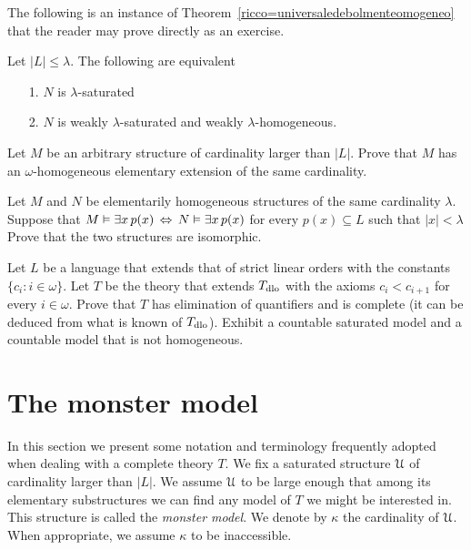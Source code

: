 The following is an instance of Theorem~\ref{ricco=universaledebolmenteomogeneo} that the reader may prove directly as an exercise.

\begin{corollary}\label{saturo=universaledebolmenteomogeneo}
Let $|L|\le\lambda$. The following are equivalent\nobreak
\begin{itemize}
\item[1.] $N$ is $\lambda\mbox{-}$saturated
\item[2.] $N$ is weakly $\lambda\mbox{-}$saturated and weakly $\lambda\mbox{-}$homogeneous.
\end{itemize}
\end{corollary}

\begin{exercise}\label{ex_omega_homogeneous_same_card}
Let $M$ be an arbitrary structure of cardinality larger than $|L|$.
Prove that $M$ has an $\omega\mbox{-}$homogeneous elementary extension of the same cardinality. 
\end{exercise}

\begin{exercise}
Let $M$ and $N$ be elementarily homogeneous structures of the same cardinality $\lambda$. 
Suppose that $M\vDash\exists x\, p(x)\,\Leftrightarrow\,N\vDash\exists x\, p(x)$ for every $p(x)\subseteq L$ such that $|x|<\lambda$
Prove that the two structures are isomorphic. 
\end{exercise}

\begin{exercise}\label{vaughtesempio}
Let $L$ be a language that extends that of strict linear orders with the constants $\{c_i: i\in\omega\}$.
Let $T$ be the theory that extends $T_{\rm dlo}$ with the axioms $c_i<c_{i+1}$ for every  $i\in\omega$. Prove that $T$ has elimination of quantifiers and is complete (it can be deduced from what is known of $T_{\rm dlo}$). 
Exhibit a countable saturated model and a countable model that is not homogeneous. 
\end{exercise}

\section{The monster model}\label{monster}
\label{compattezzasaturazione}

In this section we present some notation and terminology frequently adopted when dealing with a complete theory $T$.
We fix a saturated structure $\EuScript U$ of cardinality larger than $|L|$.
We assume $\EuScript U$ to be large enough that among its elementary substructures we can find any model of $T$ we might be interested in.
This structure is called the \emph{monster model}.
We denote by $\kappa$ the cardinality of $\EuScript U$.
When appropriate, we assume $\kappa$ to be inaccessible. 

